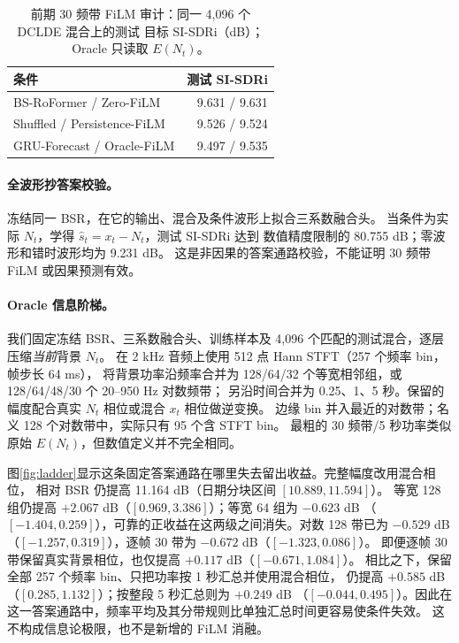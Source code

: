 \documentclass[conference]{IEEEtran}
\begin{document}
\begin{table}[t]
\caption{前期 30 频带 FiLM 审计：同一 4,096 个 DCLDE 混合上的测试
目标 SI-SDRi（dB）；Oracle 只读取 $E(N_t)$。}
\label{tab:cleanmain}\centering\footnotesize
\begin{tabular}{lr}
\toprule
条件 & 测试 SI-SDRi\\
\midrule
BS-RoFormer / Zero-FiLM & 9.631 / 9.631\\
Shuffled / Persistence-FiLM & 9.526 / 9.524\\
GRU-Forecast / Oracle-FiLM & 9.497 / 9.535\\
\bottomrule
\end{tabular}
\end{table}

\paragraph{全波形抄答案校验。}
冻结同一 BSR，在它的输出、混合及条件波形上拟合三系数融合头。
当条件为实际 $N_t$，学得 $\hat s_t=x_t-N_t$，测试 SI-SDRi 达到
数值精度限制的 80.755 dB；零波形和错时波形均为 9.231 dB。
这是非因果的答案通路校验，不能证明 30 频带 FiLM 或因果预测有效。

\paragraph{Oracle 信息阶梯。}
我们固定冻结 BSR、三系数融合头、训练样本及 4,096 个匹配的测试混合，逐层压缩\emph{当前}背景 $N_t$。
在 2 kHz 音频上使用 512 点 Hann STFT（257 个频率 bin，帧步长 64 ms），
将背景功率沿频率合并为 128/64/32 个等宽相邻组，或 128/64/48/30 个 20--950 Hz 对数频带；
另沿时间合并为 0.25、1、5 秒。保留的幅度配合真实 $N_t$ 相位或混合 $x_t$ 相位做逆变换。
边缘 bin 并入最近的对数带；名义 128 个对数带中，实际只有 95 个含 STFT bin。
最粗的 30 频带/5 秒功率类似原始 $E(N_t)$，但数值定义并不完全相同。

图\ref{fig:ladder}显示这条固定答案通路在哪里失去留出收益。完整幅度改用混合相位，
相对 BSR 仍提高 11.164 dB（日期分块区间 $[10.889,11.594]$）。
等宽 128 组仍提高 $+2.067$ dB（$[0.969,3.386]$）；等宽 64 组为 $-0.623$ dB
（$[-1.404,0.259]$），可靠的正收益在这两级之间消失。对数 128 带已为 $-0.529$ dB
（$[-1.257,0.319]$），逐帧 30 带为 $-0.672$ dB（$[-1.323,0.086]$）。
即便逐帧 30 带保留真实背景相位，也仅提高 $+0.117$ dB（$[-0.671,1.084]$）。
相比之下，保留全部 257 个频率 bin、只把功率按 1 秒汇总并使用混合相位，
仍提高 $+0.585$ dB（$[0.285,1.132]$）；按整段 5 秒汇总则为 $+0.249$ dB
（$[-0.044,0.495]$）。因此在这一答案通路中，频率平均及其分带规则比单独汇总时间更容易使条件失效。
这不构成信息论极限，也不是新增的 FiLM 消融。
\end{document}

